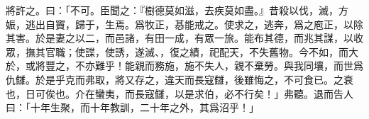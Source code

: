 將許之。曰：「不可。臣聞之：『樹德莫如滋，去疾莫如盡。』昔殺以伐，滅，方娠，逃出自竇，歸于，生焉。爲牧正，惎能戒之。使求之，逃奔，爲之庖正，以除其害。於是妻之以二，而邑諸，有田一成，有眾一旅。能布其德，而兆其謀，以收眾，撫其官職；使諜，使誘，遂滅、，復之績，祀配天，不失舊物。今不如，而大於，或將豐之，不亦難乎！能親而務施，施不失人，親不棄勞。與我同壤，而世爲仇讎。於是乎克而弗取，將又存之，違天而長寇讎，後雖悔之，不可食已。之衰也，日可俟也。介在蠻夷，而長寇讎，以是求伯，必不行矣！」弗聽。退而告人曰：「十年生聚，而十年教訓，二十年之外，其爲沼乎！」

